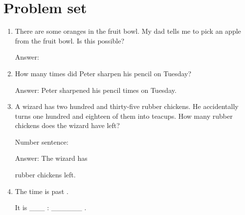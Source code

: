 \documentclass{tufte-book}
\begin{document}
\clearpage\section{Problem set }

\begin{enumerate}
\item There are some oranges in the fruit bowl. My dad tells me to pick an apple from the fruit bowl. Is this possible?\medskip\par
Answer: \dotfill\medskip

\item {}
How many times did Peter sharpen his pencil on Tuesday?\bigskip\par
Answer: Peter sharpened his pencil \dotfill\bigskip times on Tuesday.

\item A wizard has two hundred and thirty-five rubber chickens. He accidentally turns one hundred and eighteen of them into teacups. How many rubber chickens does the wizard have left?\medskip\par
Number sentence: \dotfill\medskip\par
Answer: The wizard has 
\dotfill\medskip\par\mbox{}\dotfill\medskip\par\mbox{}\dotfill\bigskip
 rubber chickens left.

\item {}
The time is \dotfill past \dotfill\bigskip.\par
It is \_\_\_ : \_\_\_\_\_\_ . \bigskip\par

\end{enumerate}
\end{document}
